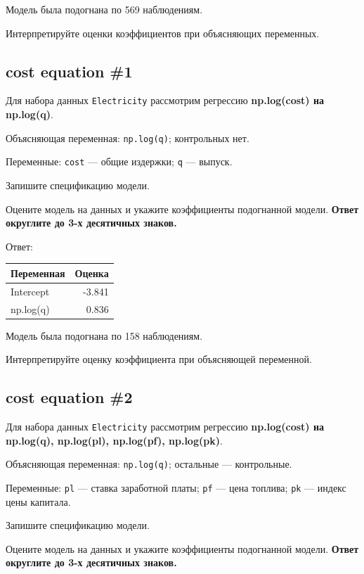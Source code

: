 \documentclass[
  russian,
]{article}
\newcounter{none} %
\begin{document}
Модель была подогнана по 569 наблюдениям.

Интерпретируйте оценки коэффициентов при объясняющих переменных.

\subsection{cost equation \#1}\label{cost-equation-1}

Для набора данных \texttt{Electricity} рассмотрим регрессию
\textbf{np.log(cost) на np.log(q)}.

Объясняющая переменная: \texttt{np.log(q)}; контрольных нет.

Переменные: \texttt{cost} --- общие издержки; \texttt{q} --- выпуск.

Запишите спецификацию модели.

Оцените модель на данных и укажите коэффициенты подогнанной модели.
\textbf{Ответ округлите до 3-х десятичных знаков.}

Ответ:

{\def\LTcaptype{none} %
\begin{longtable}[]{@{}lr@{}}
\toprule\noalign{}
Переменная & Оценка \\
\midrule\noalign{}
\endhead
\bottomrule\noalign{}
\endlastfoot
Intercept & -3.841 \\
np.log(q) & 0.836 \\
\end{longtable}
}

Модель была подогнана по 158 наблюдениям.

Интерпретируйте оценку коэффициента при объясняющей переменной.

\subsection{cost equation \#2}\label{cost-equation-2}

Для набора данных \texttt{Electricity} рассмотрим регрессию
\textbf{np.log(cost) на np.log(q), np.log(pl), np.log(pf), np.log(pk)}.

Объясняющая переменная: \texttt{np.log(q)}; остальные --- контрольные.

Переменные: \texttt{pl} --- ставка заработной платы; \texttt{pf} ---
цена топлива; \texttt{pk} --- индекс цены капитала.

Запишите спецификацию модели.

Оцените модель на данных и укажите коэффициенты подогнанной модели.
\textbf{Ответ округлите до 3-х десятичных знаков.}
\end{document}
